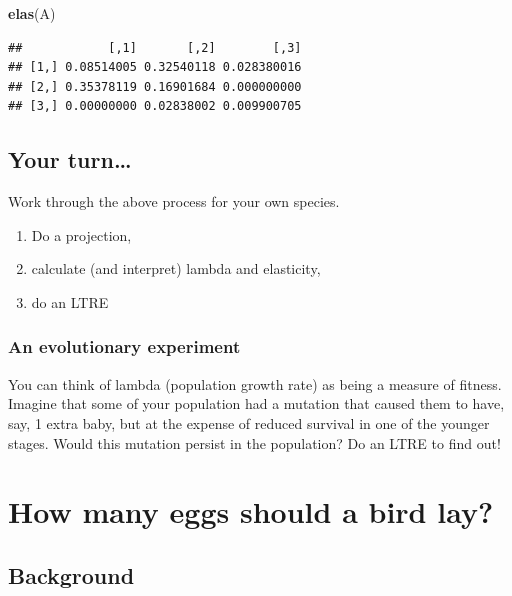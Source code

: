 \documentclass[
  a4paper]{book}
\newenvironment{Shaded}{\begin{snugshade}}{\end{snugshade}}
\newcommand{\FunctionTok}[1]{\textcolor[rgb]{0.13,0.29,0.53}{\textbf{#1}}}
\newcommand{\NormalTok}[1]{#1}
\providecommand{\tightlist}{%
  \setlength{\itemsep}{0pt}\setlength{\parskip}{0pt}}
\begin{document}
\begin{Shaded}
\begin{Highlighting}[]
\FunctionTok{elas}\NormalTok{(A)}
\end{Highlighting}
\end{Shaded}

\begin{verbatim}
##            [,1]       [,2]        [,3]
## [1,] 0.08514005 0.32540118 0.028380016
## [2,] 0.35378119 0.16901684 0.000000000
## [3,] 0.00000000 0.02838002 0.009900705
\end{verbatim}

\hypertarget{your-turn}{%
\section{Your turn\ldots{}}\label{your-turn}}

Work through the above process for your own species.

\begin{enumerate}
\def\labelenumi{(\arabic{enumi})}
\tightlist
\item
  Do a projection,
\item
  calculate (and interpret) lambda and elasticity,
\item
  do an LTRE
\end{enumerate}

\hypertarget{an-evolutionary-experiment}{%
\subsection{An evolutionary experiment}\label{an-evolutionary-experiment}}

You can think of lambda (population growth rate) as being a measure of fitness. Imagine that some of your population had a mutation that caused them to have, say, 1 extra baby, but at the expense of reduced survival in one of the younger stages. Would this mutation persist in the population? Do an LTRE to find out!

\hypertarget{how-many-eggs-should-a-bird-lay}{%
\chapter{How many eggs should a bird lay?}\label{how-many-eggs-should-a-bird-lay}}

\hypertarget{background-7}{%
\section{Background}\label{background-7}}
\end{document}
